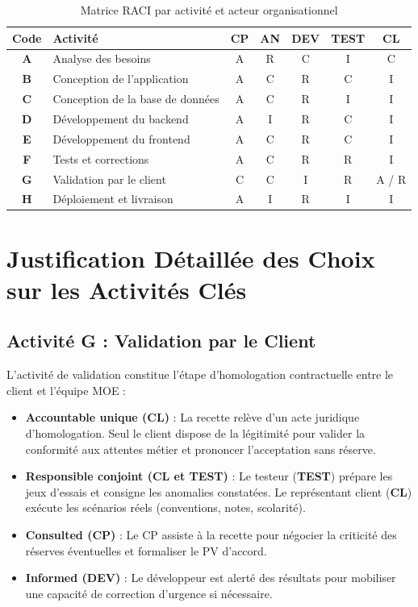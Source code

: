 \documentclass[a4paper,12pt]{report}
\begin{document}
	\begin{table}[H]
		\centering
		\small
		\renewcommand{\arraystretch}{1.12}
		\caption{Matrice RACI par activité et acteur organisationnel}
		\label{tab:matrice_raci_planif}
		\begin{tabularx}{\textwidth}{c >{\raggedright\arraybackslash}X c c c c c}
			\toprule
			\textbf{Code} & \textbf{Activité} & \textbf{CP} & \textbf{AN} & \textbf{DEV} & \textbf{TEST} & \textbf{CL} \\
			\midrule
			\textbf{A} & Analyse des besoins & A & R & C & I & C \\
			\textbf{B} & Conception de l'application & A & C & R & C & I \\
			\textbf{C} & Conception de la base de données & A & C & R & I & I \\
			\textbf{D} & Développement du backend & A & I & R & C & I \\
			\textbf{E} & Développement du frontend & A & C & R & C & I \\
			\textbf{F} & Tests et corrections & A & C & R & R & I \\
			\textbf{G} & Validation par le client & C & C & I & R & A / R \\
			\textbf{H} & Déploiement et livraison & A & I & R & I & I \\
			\bottomrule
		\end{tabularx}
	\end{table}
	
	\clearpage
	\section{Justification Détaillée des Choix sur les Activités Clés}
	
	\subsection{Activité G : Validation par le Client}
	L'activité de validation constitue l'étape d'homologation contractuelle entre le client et l'équipe MOE :
	\begin{itemize}[leftmargin=1.0cm, noitemsep, topsep=1pt]
		\item \textbf{Accountable unique (CL)} : La recette relève d'un acte juridique d'homologation. Seul le client dispose de la légitimité pour valider la conformité aux attentes métier et prononcer l'acceptation sans réserve.
		\item \textbf{Responsible conjoint (CL et TEST)} : Le testeur (\textbf{TEST}) prépare les jeux d'essais et consigne les anomalies constatées. Le représentant client (\textbf{CL}) exécute les scénarios réels (conventions, notes, scolarité).
		\item \textbf{Consulted (CP)} : Le CP assiste à la recette pour négocier la criticité des réserves éventuelles et formaliser le PV d'accord.
		\item \textbf{Informed (DEV)} : Le développeur est alerté des résultats pour mobiliser une capacité de correction d'urgence si nécessaire.
	\end{itemize}
	
\end{document}
